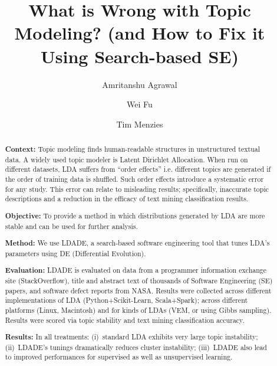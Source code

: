 \documentclass[twocolumn,5p,sort&compress]{elsarticle}
\theoremstyle{break}
\begin{document}
\begin{frontmatter}

\title{What is  Wrong with
Topic Modeling? (and How to Fix it Using Search-based SE)}



\author[label1]{Amritanshu Agrawal}
\address[label1]{Department of Computer Science, North Carolina State University, Raleigh, NC, USA}



\author[label1]{Wei Fu}

\author[label1]{Tim Menzies}

\begin{abstract}

\noindent \textbf{Context:} Topic modeling finds
  human-readable structures in unstructured textual data. A
  widely used topic modeler is Latent Dirichlet Allocation. When
  run on different datasets, LDA suffers from ``order effects''
  i.e.
 different topics are generated if the order of training data is shuffled.
  Such order effects introduce a
 systematic error for any study. This error can relate to misleading results;
  specifically, inaccurate topic descriptions and a reduction in the efficacy of
  text mining classification results.

 \noindent
\textbf{Objective:} To provide a method in which distributions
generated by LDA are more stable and can be used for further analysis.

 \noindent
\textbf{Method:} We use LDADE, a search-based software engineering tool that tunes LDA's parameters using DE 
(Differential Evolution).

\noindent
\textbf{Evaluation:} 
LDADE is evaluated on data from a programmer
information exchange site (StackOverflow), title and abstract text of thousands
of Software Engineering (SE) papers, and software defect reports from NASA. Results were collected
across different implementations of LDA (Python+Scikit-Learn, Scala+Spark); across
different platforms (Linux, Macintosh) and for kinds of LDAs (VEM, or using Gibbs sampling). 
Results were scored via topic stability and text mining classification accuracy.

\noindent
\textbf{Results:}
In all treatments:
   (i)~standard LDA exhibits very large topic instability;
  (ii)~LDADE's tunings dramatically reduces cluster instability; 
  (iii)~LDADE also lead to  improved performances for supervised as well as unsupervised learning.


\end{abstract}
\end{frontmatter}
\end{document}
